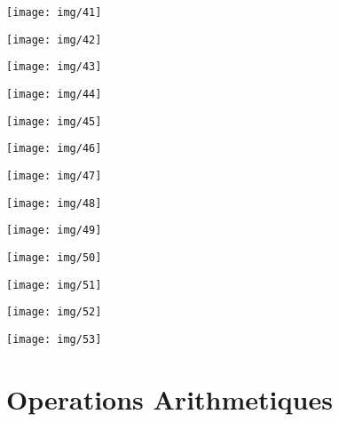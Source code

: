 \documentclass[a4paper, 12pt, twoside,openright]{report}
\begin{document}
\begin{landscape} 		
	\texttt{[image: img/41]}
\end{landscape}
\begin{landscape} 		
	\texttt{[image: img/42]}
\end{landscape}
\begin{landscape} 		
	\texttt{[image: img/43]}
\end{landscape}
\begin{landscape} 		
	\texttt{[image: img/44]}
\end{landscape}
\begin{landscape} 		
	\texttt{[image: img/45]}
\end{landscape}
\begin{landscape} 		
	\texttt{[image: img/46]}
\end{landscape}
\begin{landscape} 		
	\texttt{[image: img/47]}
\end{landscape}
\begin{landscape} 		
	\texttt{[image: img/48]}
\end{landscape}
\begin{landscape} 		
	\texttt{[image: img/49]}
\end{landscape}
\begin{landscape} 		
	\texttt{[image: img/50]}
\end{landscape}
\begin{landscape} 		
	\texttt{[image: img/51]}
\end{landscape}
\begin{landscape} 		
	\texttt{[image: img/52]}
\end{landscape}
\begin{landscape} 		
	\texttt{[image: img/53]}
\end{landscape}

\part{Operations Arithmetiques}
\end{document}
